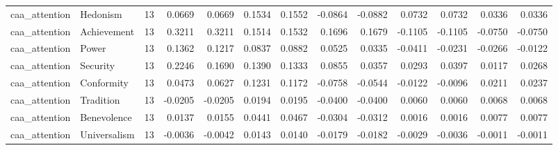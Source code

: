 \begin{tabular}{llrrrrrrrrrrr}
caa\_attention & Hedonism & 13 & 0.0669 & 0.0669 & 0.1534 & 0.1552 & -0.0864 & -0.0882 & 0.0732 & 0.0732 & 0.0336 & 0.0336 \\
caa\_attention & Achievement & 13 & 0.3211 & 0.3211 & 0.1514 & 0.1532 & 0.1696 & 0.1679 & -0.1105 & -0.1105 & -0.0750 & -0.0750 \\
caa\_attention & Power & 13 & 0.1362 & 0.1217 & 0.0837 & 0.0882 & 0.0525 & 0.0335 & -0.0411 & -0.0231 & -0.0266 & -0.0122 \\
caa\_attention & Security & 13 & 0.2246 & 0.1690 & 0.1390 & 0.1333 & 0.0855 & 0.0357 & 0.0293 & 0.0397 & 0.0117 & 0.0268 \\
caa\_attention & Conformity & 13 & 0.0473 & 0.0627 & 0.1231 & 0.1172 & -0.0758 & -0.0544 & -0.0122 & -0.0096 & 0.0211 & 0.0237 \\
caa\_attention & Tradition & 13 & -0.0205 & -0.0205 & 0.0194 & 0.0195 & -0.0400 & -0.0400 & 0.0060 & 0.0060 & 0.0068 & 0.0068 \\
caa\_attention & Benevolence & 13 & 0.0137 & 0.0155 & 0.0441 & 0.0467 & -0.0304 & -0.0312 & 0.0016 & 0.0016 & 0.0077 & 0.0077 \\
caa\_attention & Universalism & 13 & -0.0036 & -0.0042 & 0.0143 & 0.0140 & -0.0179 & -0.0182 & -0.0029 & -0.0036 & -0.0011 & -0.0011 \\
\bottomrule
\end{tabular}
